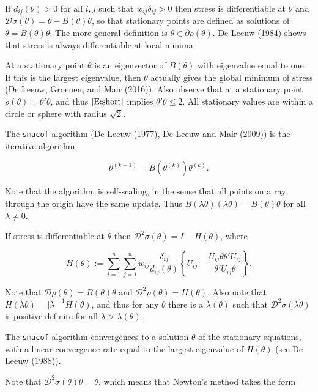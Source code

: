 \documentclass[12pt,]{article}
\begin{document}
If \(d_{ij}(\theta)>0\) for all \(i,j\) such that
\(w_{ij}\delta_{ij}>0\) then stress is differentiable at \(\theta\) and
\(\mathcal{D}\sigma(\theta)=\theta-B(\theta)\theta\), so that stationary
points are defined as solutions of \(\theta=B(\theta)\theta\). The more
general definition is \(\theta\in\partial\rho(\theta)\). De Leeuw (1984)
shows that stress is always differentiable at local minima.

At a stationary point \(\theta\) is an eigenvector of \(B(\theta)\) with
eigenvalue equal to one. If this is the largest eigenvalue, then
\(\theta\) actually gives the global minimum of stress (De Leeuw,
Groenen, and Mair (2016)). Also observe that at a stationary point
\(\rho(\theta)=\theta'\theta\), and thus \(\eqref{E:short}\) implies
\(\theta'\theta\leq 2\). All stationary values are within a circle or
sphere with radius \(\sqrt{2}\).

The \texttt{smacof} algorithm (De Leeuw (1977), De Leeuw and Mair
(2009)) is the iterative algorithm

\begin{equation}
\theta^{(k+1)}=B(\theta^{(k)})\theta^{(k)}.
\end{equation}

Note that the algorithm is self-scaling, in the sense that all points on
a ray through the origin have the same update. Thus
\(B(\lambda\theta)(\lambda\theta)= B(\theta)\theta\) for all
\(\lambda\not= 0\).

If stress is differentiable at \(\theta\) then
\(\mathcal{D}^2\sigma(\theta)=I-H(\theta)\), where

\begin{equation}
H(\theta):=\sum_{i=1}^n\sum_{j=1}^nw_{ij}\frac{\delta_{ij}}{d_{ij}(\theta)}\left\{U_{ij}-\frac{U_{ij}\theta\theta'U_{ij}}{\theta'U_{ij}\theta}\right\}.
\end{equation}

Note that \(\mathcal{D}\rho(\theta)=B(\theta)\theta\) and
\(\mathcal{D}^2\rho(\theta)=H(\theta)\). Also note that
\(H(\lambda\theta)=|\lambda|^{-1}H(\theta)\), and thus for any
\(\theta\) there is a \(\lambda(\theta)\) such that
\(\mathcal{D}^2\sigma(\lambda\theta)\) is positive definite for all
\(\lambda>\lambda(\theta)\).

The \texttt{smacof} algorithm convergences to a solution \(\theta\) of
the stationary equations, with a linear convergence rate equal to the
largest eigenvalue of \(H(\theta)\) (see De Leeuw (1988)).

Note that \(\mathcal{D}^2\sigma(\theta)\theta=\theta\), which means that
Newton's method takes the form
\end{document}
